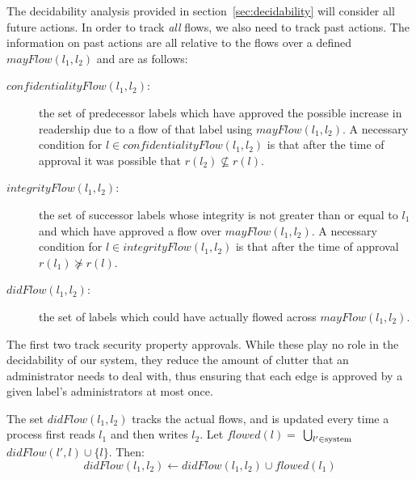\documentclass[11pt]{article}
\begin{document}
The decidability analysis provided in section~\ref{sec:decidability}
will consider all future actions.
In order to track \emph{all} flows, we also need to track past actions.
The information on past actions are all relative to the
flows over a defined \(mayFlow(l_1,l_2)\) and are as follows:
\begin{description}
\item[$confidentialityFlow(l_1,l_2)$:] the set of predecessor labels
  which have approved the possible increase in readership due to a flow of that
  label using $mayFlow(l_1,l_2)$.
  A necessary condition for $l\in confidentialityFlow(l_1,l_2)$
  is that after the time of approval it was possible that
  $r(l_2) \not\subseteq r(l)$.
\item[$integrityFlow(l_1,l_2)$:] the set of successor labels
  whose integrity is not greater than or equal to $l_1$
  and which have approved a flow over $mayFlow(l_1,l_2)$.
  A necessary condition for $l\in integrityFlow(l_1,l_2)$
  is that after the time of approval $r(l_1) \not\succeq r(l)$.
\item[$didFlow(l_1,l_2)$:] the set of labels which could have
  actually flowed across $mayFlow(l_1,l_2)$.
\end{description}
The first two track security property approvals.
While these play no role in the decidability of
our system, they reduce the amount of clutter that
an administrator needs to deal with, thus ensuring
that each edge is approved by a given label's administrators
at most once.

The set \(didFlow(l_1,l_2)\) tracks the actual flows,
and is updated  every time a process first reads $l_1$ and then writes $l_2$.
Let $flowed(l)=$
$ \bigcup_{l' \in \mbox{\scriptsize system}}$
$didFlow(l',l) \cup \{l\}$.
 Then:
\begin{equation}
    didFlow(l_1,l_2) \leftarrow didFlow(l_1,l_2) \cup flowed(l_1)
\end{equation}
\end{document}
